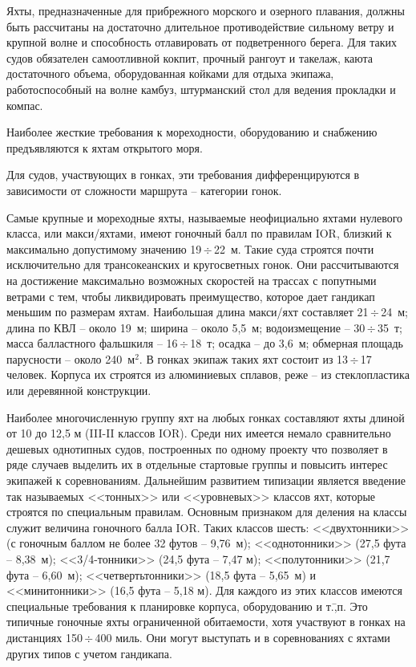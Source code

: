 \documentclass[a4paper, 12pt, twoside, final, book, russian, fittopage, cyremdash]{ncc}
\newcommand{\otdo}{\,\ensuremath{\div}\,}
\newcommand{\msq}{~м\ensuremath{^2}\xspace}
\begin{document}
Яхты, предназначенные для прибрежного морского и озерного плавания, должны быть рассчитаны на достаточно длительное противодействие сильному ветру и крупной волне и способность отлавировать от подветренного берега. Для таких судов обязателен самоотливной кокпит, прочный рангоут и такелаж, каюта достаточного объема, оборудованная койками для отдыха экипажа, работоспособный на волне камбуз, штурманский стол для ведения прокладки и компас. 

Наиболее жесткие требования к мореходности, оборудованию и снабжению предъявляются к яхтам открытого моря. 

Для судов, участвующих в гонках, эти требования дифференцируются в зависимости от сложности маршрута \--- категории гонок. 

Самые крупные и мореходные яхты, называемые неофициально яхтами нулевого класса, или макси\-/яхтами, имеют гоночный балл по правилам IOR, близкий к максимально допустимому значению 19\otdo 22~м. Такие суда строятся почти исключительно для трансокеанских и кругосветных гонок. Они рассчитываются на достижение максимально возможных скоростей на трассах с попутными ветрами с тем, чтобы ликвидировать преимущество, которое дает гандикап меньшим по размерам яхтам. Наибольшая длина макси\-/яхт составляет 21\otdo 24~м; длина по КВЛ \--- около 19~м; ширина \--- около 5,5~м; водоизмещение \--- 30\otdo 35~т; масса балластного фальшкиля \--- 16\otdo 18~т; осадка \--- до 3,6~м; обмерная площадь парусности \--- около 240\msq. В гонках экипаж таких яхт состоит из 13\otdo 17 человек. Корпуса их строятся из алюминиевых сплавов, реже \--- из стеклопластика или деревянной конструкции. 

Наиболее многочисленную группу яхт на любых гонках составляют яхты длиной от 10 до 12,5 м (III\--II классов IOR). Среди них имеется немало сравнительно дешевых однотипных судов, построенных по одному проекту что позволяет в ряде случаев выделить их в отдельные стартовые группы и повысить интерес экипажей к соревнованиям.
Дальнейшим развитием типизации является введение так называемых <<тонных>> или <<уровневых>> классов яхт, которые строятся по специальным правилам. Основным признаком для деления на классы служит величина гоночного балла IOR. Таких классов шесть: <<двухтонники>> (с гоночным баллом не более 32 футов \--- 9,76~м); <<однотонники>> (27,5 фута \--- 8,38~м); <<3/4-тонники>> (24,5 фута \--- 7,47 м); <<полутонники>> (21,7 фута \--- 6,60~м); <<четвертьтонники>> (18,5 фута \--- 5,65~м) и <<минитонники>> (16,5 фута \--- 5,18 м). Для каждого из этих классов имеются специальные требования к планировке корпуса, оборудованию и т.\=,п. Это типичные гоночные яхты ограниченной обитаемости, хотя участвуют в гонках на дистанциях 150\otdo 400 миль. Они могут выступать и в соревнованиях с яхтами других типов с учетом гандикапа.
\end{document}
